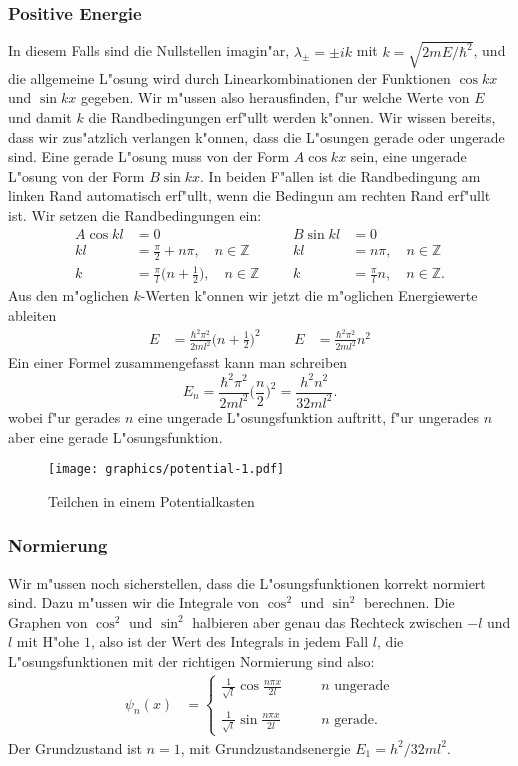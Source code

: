 \subsubsection{Positive Energie}
In diesem Falls sind die Nullstellen imagin"ar, $\lambda_\pm=\pm ik$
mit $k=\sqrt{2mE/\hbar^2}$,
und die allgemeine L"osung wird durch Linearkombinationen der Funktionen
$\cos kx$ und $\sin kx$ gegeben.
Wir m"ussen also herausfinden, f"ur welche Werte von $E$ und damit $k$
die Randbedingungen erf"ullt werden k"onnen.
Wir wissen bereits, dass wir zus"atzlich verlangen k"onnen, dass die
L"osungen gerade oder ungerade sind.
Eine gerade L"osung muss von der Form $A\cos kx$ sein, eine ungerade
L"osung von der Form $B\sin kx$.
In beiden F"allen ist die Randbedingung am linken Rand automatisch
erf"ullt, wenn die Bedingun am rechten Rand erf"ullt ist.
Wir setzen die Randbedingungen ein:
\begin{align*}
A\cos kl&=0
	&&&
		B\sin kl&=0\\
kl&=\frac{\pi}2+n\pi,\quad n\in\mathbb Z
	&&&
		kl&=n\pi,\quad n\in\mathbb Z\\
k&=\frac{\pi}{l}\biggl(n+\frac12\biggr),\quad n\in\mathbb Z
	&&&
		k&=\frac{\pi}{l}n,\quad n\in\mathbb Z.
\end{align*}
Aus den m"oglichen $k$-Werten k"onnen wir jetzt die m"oglichen 
Energiewerte ableiten
\begin{align*}
E&=\frac{\hbar^2\pi^2}{2ml^2}\biggl(n+\frac12\biggr)^2
&&&
E&=\frac{\hbar^2\pi^2}{2ml^2}n^2
\end{align*}
Ein einer Formel zusammengefasst kann man schreiben
\[
E_n
=
\frac{\hbar^2\pi^2}{2ml^2}\biggl(\frac{n}{2}\biggr)^2
=
\frac{h^2n^2}{32ml^2}.
\]
wobei f"ur gerades $n$ eine ungerade L"osungsfunktion auftritt,
f"ur ungerades $n$ aber eine gerade L"osungsfunktion.
\begin{figure}
\centering
\texttt{[image: graphics/potential-1.pdf]}
\caption{Teilchen in einem Potentialkasten
\label{skript:potentialkasten}}
\end{figure}

\subsubsection{Normierung}
Wir m"ussen noch sicherstellen, dass die L"osungsfunktionen korrekt
normiert sind.
Dazu m"ussen wir die Integrale von $\cos^2$ und $\sin^2$ berechnen.
Die Graphen von $\cos^2$ und $\sin^2$ halbieren aber genau das
Rechteck zwischen $-l$ und $l$ mit H"ohe $1$, also ist der Wert
des Integrals in jedem Fall $l$, die L"osungsfunktionen mit
der richtigen Normierung sind also:
\begin{align*}
\psi_n(x)
&=
\begin{cases}
\displaystyle
\frac{1}{\sqrt{l}}\cos\frac{n \pi x}{2l}&\qquad \text{$n$ ungerade}\\
\\
\displaystyle
\frac{1}{\sqrt{l}}\sin\frac{n \pi x}{2l}&\qquad \text{$n$ gerade}.
\end{cases}
\end{align*}
Der Grundzustand ist $n=1$, mit Grundzustandsenergie $E_1=h^2/32ml^2$.

